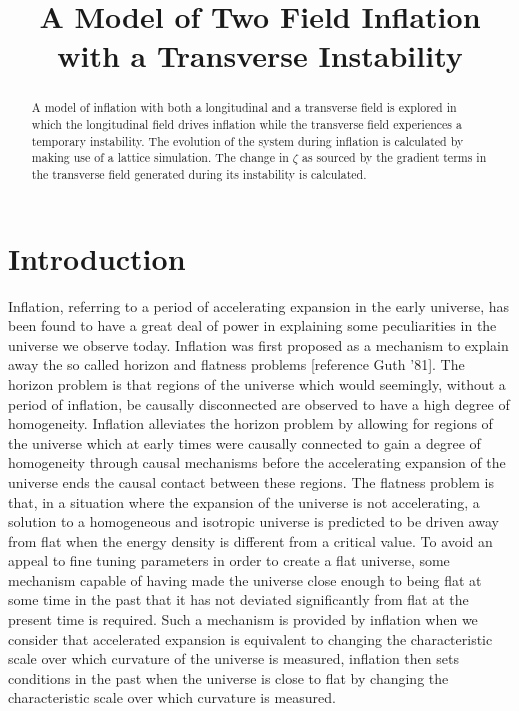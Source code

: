 \documentclass[letterpaper,11pt]{article}
\title{A Model of Two Field Inflation with a Transverse Instability}
\begin{document}
\begin{abstract}
A model of inflation with both a longitudinal and a transverse field is explored in which the longitudinal field drives inflation while the transverse field experiences a temporary instability. The evolution of the system during inflation is calculated by making use of a lattice simulation. The change in $\zeta$ as sourced by the gradient terms in the transverse field generated during its instability is calculated.
\end{abstract}
\section{Introduction}
Inflation, referring to a period of accelerating expansion in the early universe, has been found to have a great deal of power in explaining some peculiarities in the universe we observe today.
Inflation was first proposed as a mechanism to explain away the so called horizon and flatness problems [reference Guth '81].%
The horizon problem is that regions of the universe which would seemingly, without a period of inflation, be causally disconnected are observed to have a high degree of homogeneity.%
Inflation alleviates the horizon problem by allowing for regions of the universe which at early times were causally connected to gain a degree of homogeneity through causal mechanisms before the accelerating expansion of the universe ends the causal contact between these regions. The flatness problem is that, in a situation where the expansion of the universe is not accelerating, a solution to a homogeneous and isotropic universe is predicted to be driven away from flat when the energy density is different from a critical value. To avoid an appeal to fine tuning parameters in order to create a flat universe, some mechanism capable of having made the universe close enough to being flat at some time in the past that it has not deviated significantly from flat at the present time is required. Such a mechanism is provided by inflation when we consider that accelerated expansion is equivalent to changing the characteristic scale over which curvature of the universe is measured, inflation then sets conditions in the past when the universe is close to flat by changing the characteristic scale over which curvature is measured.
\end{document}
